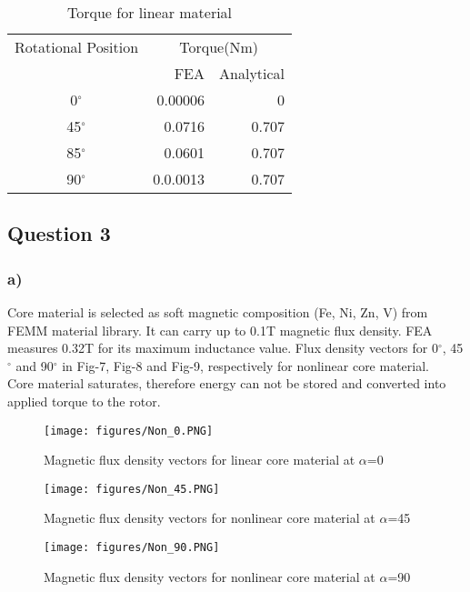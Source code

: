 \documentclass[11pt, a4paper]{article}
\begin{document}
\begin{table}[ht]
\centering
\caption{Torque for linear material} 
\begin{tabular}[t]{c|r r}
\hline
Rotational Position & \multicolumn{2}{c}{Torque(Nm)}\\
\cline{2-3}
                           & FEA         & Analytical \\
\hline
0$^\circ$     & 0.00006     & 0          \\
45$^\circ$    & 0.0716      & 0.707      \\
85$^\circ$    & 0.0601      & 0.707      \\
90$^\circ$    & 0.0.0013    & 0.707          \\
\hline
\end{tabular}
\label{tab:linear_tor}
\end{table}

\subsection*{Question 3}
\subsubsection*{a)}

 Core material is selected as soft magnetic composition (Fe, Ni, Zn, V) from FEMM material library. It can carry up to 0.1T magnetic flux density.  FEA measures 0.32T for its maximum inductance value. Flux density vectors for 0$^\circ$, 45$^\circ$ and 90$^\circ$ in Fig-7, Fig-8 and Fig-9, respectively for nonlinear core material.\\
 
 Core material saturates, therefore energy can not be stored and converted into applied torque to the rotor.

\begin{figure}[ht]
\centering
\texttt{[image: figures/Non\_0.PNG]}
\caption{Magnetic flux density vectors for linear core material at $\alpha$=0 } \label{Non_0}
\end{figure}

\begin{figure}[ht]
\centering
\texttt{[image: figures/Non\_45.PNG]}
\caption{Magnetic flux density vectors for nonlinear core material at $\alpha$=45 } \label{Non_45}
\end{figure}

\begin{figure}[ht]
\centering
\texttt{[image: figures/Non\_90.PNG]}
\caption{Magnetic flux density vectors for nonlinear core material at $\alpha$=90 } \label{Non_90}
\end{figure}
\end{document}
